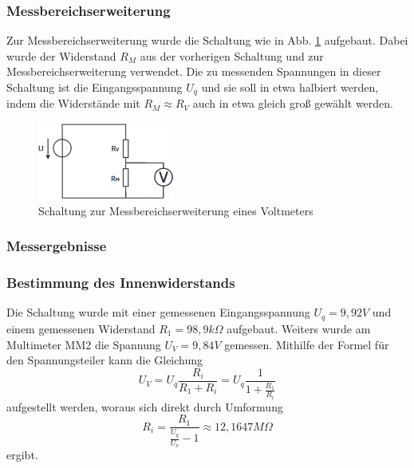 \documentclass[a4paper]{article}
\begin{document}
\subsubsection*{Messbereichserweiterung}
Zur Messbereichserweiterung wurde die Schaltung wie in Abb. \ref{fig:1c_MB-ErweiterungVM}
aufgebaut. Dabei wurde der Widerstand $R_{M}$ aus der vorherigen Schaltung
und zur Messbereichserweiterung verwendet. Die zu messenden Spannungen in dieser
Schaltung ist die Eingangsspannung $U_{q}$ und sie soll in etwa halbiert werden, indem
die Widerstände mit $R_{M}\approx R_{V}$ auch in etwa gleich groß gewählt werden.
\begin{figure}[h]
    \centering
    \includegraphics[width=0.4\textwidth]{schematics/1c_MessbereichserweiterungVM.png}
    \caption{Schaltung zur Messbereichserweiterung eines Voltmeters}
    \label{fig:1c_MB-ErweiterungVM}
\end{figure}

\subsubsection{Messergebnisse}
\subsubsection*{\textbf{Bestimmung des Innenwiderstands}}
Die Schaltung wurde mit einer gemessenen Eingangsspannung $U_{q}=9,92\unit{V}$ und einem
gemessenen Widerstand $R_{1}=98,9 \unit{k\Omega}$ aufgebaut. Weiters wurde am
Multimeter MM2 die Spannung $U_{V}=9,84\unit{V}$ gemessen. Mithilfe der Formel
für den Spannungsteiler kann die Gleichung
\[ U_{V}=U_{q} \frac{R_{i}}{R_{1}+R_{i}} = U_{q} \frac{1}{1 + \frac{R_{1}}{R_{i}}}\]
aufgestellt werden, woraus sich direkt durch Umformung
\[ R_{i}=\frac{R_{1}}{\frac{U_{q}}{U_{v}}-1}\approx 12,1647 \unit{M\Omega} \]
ergibt.
\end{document}
